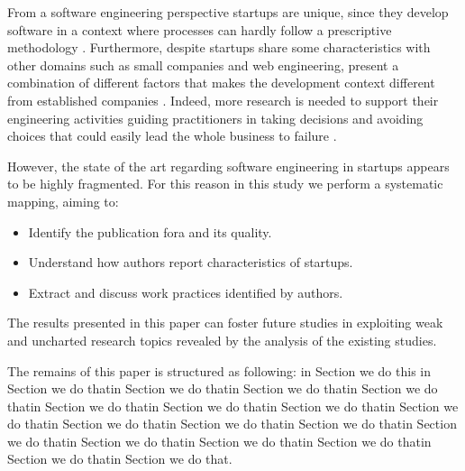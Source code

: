 \documentclass[final,5p,times,twocolumn]{elsarticle}
\begin{document}
From a software engineering perspective startups are unique, since they develop software in a context where processes can hardly follow a prescriptive methodology \cite{Coleman2008}. Furthermore, despite startups share some characteristics with other domains such as small companies and web engineering, present a combination of different factors that makes the development context different from established companies \cite{Blank2005}. Indeed, more research is needed to support their engineering activities guiding practitioners in taking decisions and avoiding choices that could easily lead the whole business to failure \cite{Kajko-Mattsson2008,Coleman2005}.

However, the state of the art regarding software engineering in startups  appears to be highly fragmented. For this reason in this study we perform a systematic mapping, aiming to:
\begin{itemize}

\item Identify the publication fora and its quality.
\item Understand how authors report characteristics of startups.
\item Extract and discuss work practices identified by authors.
\end{itemize}

The results presented in this paper can foster future studies in exploiting weak and uncharted  research topics revealed by the analysis of the existing studies.

The remains of this paper is structured as following: in Section we do this in Section we do thatin Section we do thatin Section we do thatin Section we do thatin Section we do thatin Section we do thatin Section we do thatin Section we do thatin Section we do thatin Section we do thatin Section we do thatin Section we do thatin Section we do thatin Section we do thatin Section we do thatin Section we do thatin Section we do that.






\end{document}

